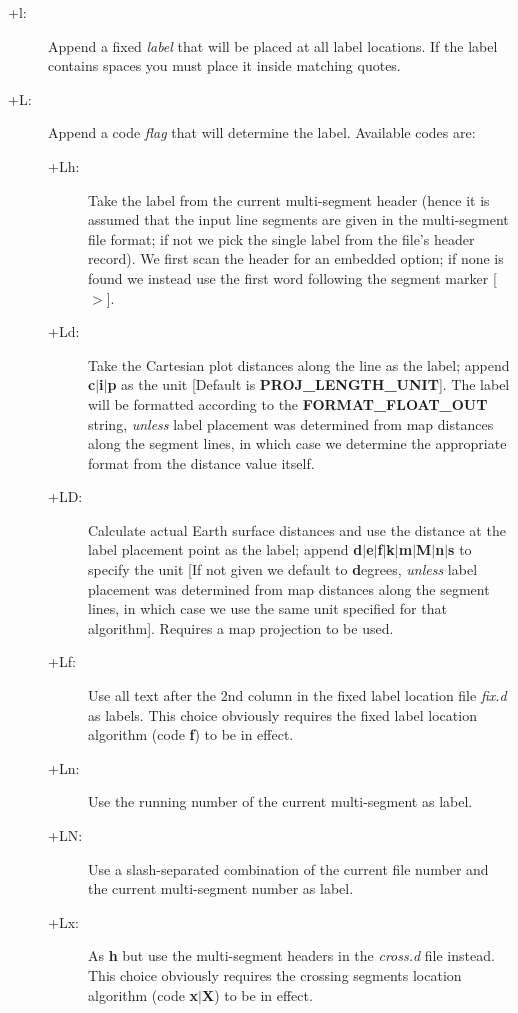 \begin{description}
\item [+l:] Append a fixed {\it label} that will be placed at all label locations.  If the label contains
spaces you must place it inside matching quotes.
\item [+L:] Append a code {\it flag} that will determine the label.  Available codes are:
\begin{description}
\item [+Lh:]  Take the label from the current multi-segment header (hence it is assumed that the
input line segments are given in the multi-segment file format; if not we pick the single label
from the file's header record).  We first scan the header for an embedded
 option; if none is found we instead use the first word following the segment marker [$>$].
\item [+Ld:] Take the Cartesian plot distances along the line as the label; append {\bf c$|$i$|$p}
as the unit [Default is \textbf{PROJ\_LENGTH\_UNIT}].  The label will be formatted according to the \textbf{FORMAT\_FLOAT\_OUT}
string, \emph{unless} label placement was determined from map distances along the segment lines, in which
case we determine the appropriate format from the distance value itself. 
\item [+LD:]  Calculate actual Earth surface distances and use the distance at the label placement point as
the label; append {\bf d$|$e$|$f$|$k$|$m$|$M$|$n$|$s} to specify the unit [If not given we default to {\bf d}egrees,
\emph{unless} label placement was determined from map distances along the segment lines, in which case we
use the same unit specified for that algorithm].  Requires a map projection to be used.
\item [+Lf:]  Use all text after the 2nd column in the fixed label location file {\it fix.d} as labels.
This choice obviously requires the fixed label location algorithm (code {\bf f}) to be in effect.
\item [+Ln:]  Use the running number of the current multi-segment as label.
\item [+LN:]  Use a slash-separated combination of the current file number and the current multi-segment number as label.
\item [+Lx:]  As {\bf h} but use the multi-segment headers in the {\it cross.d} file instead.
This choice obviously requires the crossing segments location algorithm (code {\bf x$|$X}) to be in effect.
\end{description}
\end{description}

